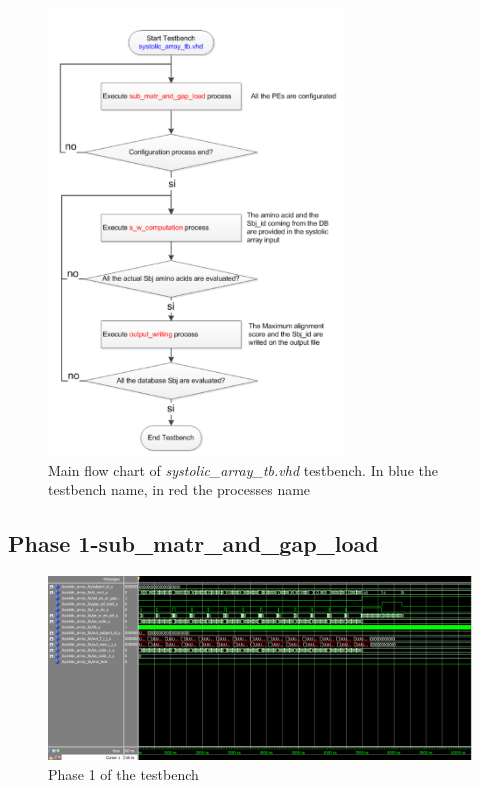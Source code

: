 \begin{figure}[h!]
	\centering
	\includegraphics[width=0.7\textwidth]{imm/sw/tb_flow.png} 	\caption{Main flow chart of \textit{systolic\_array\_tb.vhd} testbench. In blue the testbench name, in red the processes name} 
	\label{tb_sw_flow}
\end{figure}

\clearpage
\newpage

\subsection{Phase 1-sub\_matr\_and\_gap\_load }
\begin{figure}[h!]
	\centering
	\includegraphics[width=\textwidth]{imm/sw/configuration_phase.png} 	\caption{Phase 1 of the testbench} 
	\label{tb_sw_1}
\end{figure}